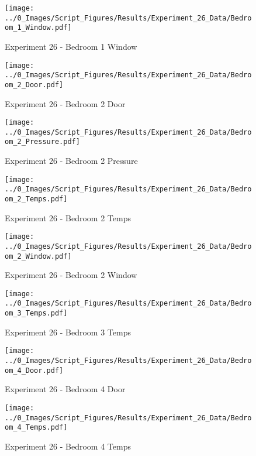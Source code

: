	\clearpage

	\begin{figure}[H]
		\centering
		\texttt{[image: ../0\_Images/Script\_Figures/Results/Experiment\_26\_Data/Bedroom\_1\_Window.pdf]}
		\caption[]{Experiment 26 - Bedroom 1 Window}
	\end{figure}
 

	\begin{figure}[H]
		\centering
		\texttt{[image: ../0\_Images/Script\_Figures/Results/Experiment\_26\_Data/Bedroom\_2\_Door.pdf]}
		\caption[]{Experiment 26 - Bedroom 2 Door}
	\end{figure}
 
	\clearpage

	\begin{figure}[H]
		\centering
		\texttt{[image: ../0\_Images/Script\_Figures/Results/Experiment\_26\_Data/Bedroom\_2\_Pressure.pdf]}
		\caption[]{Experiment 26 - Bedroom 2 Pressure}
	\end{figure}
 

	\begin{figure}[H]
		\centering
		\texttt{[image: ../0\_Images/Script\_Figures/Results/Experiment\_26\_Data/Bedroom\_2\_Temps.pdf]}
		\caption[]{Experiment 26 - Bedroom 2 Temps}
	\end{figure}
 
	\clearpage

	\begin{figure}[H]
		\centering
		\texttt{[image: ../0\_Images/Script\_Figures/Results/Experiment\_26\_Data/Bedroom\_2\_Window.pdf]}
		\caption[]{Experiment 26 - Bedroom 2 Window}
	\end{figure}
 

	\begin{figure}[H]
		\centering
		\texttt{[image: ../0\_Images/Script\_Figures/Results/Experiment\_26\_Data/Bedroom\_3\_Temps.pdf]}
		\caption[]{Experiment 26 - Bedroom 3 Temps}
	\end{figure}
 
	\clearpage

	\begin{figure}[H]
		\centering
		\texttt{[image: ../0\_Images/Script\_Figures/Results/Experiment\_26\_Data/Bedroom\_4\_Door.pdf]}
		\caption[]{Experiment 26 - Bedroom 4 Door}
	\end{figure}
 

	\begin{figure}[H]
		\centering
		\texttt{[image: ../0\_Images/Script\_Figures/Results/Experiment\_26\_Data/Bedroom\_4\_Temps.pdf]}
		\caption[]{Experiment 26 - Bedroom 4 Temps}
	\end{figure}
 
